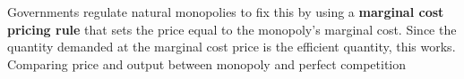                     Governments regulate natural monopolies to fix this by using a \textbf{marginal cost pricing rule} that sets the price equal to the monopoly's marginal cost.
                    Since the quantity demanded at the marginal cost price is the efficient quantity, this works.
            Comparing price and output between monopoly and perfect competition






